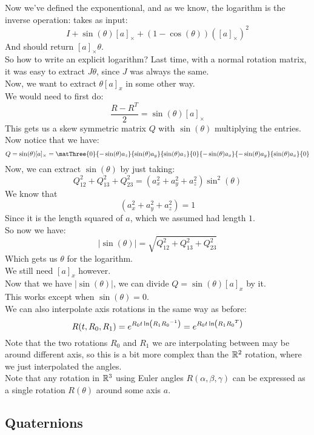\documentclass[12pt]{article}
\begin{document}
Now we've defined the exponentional,
and as we know, the logarithm is the inverse
operation: takes as input:
\[ I + \sin(\theta)[a]_\times 
+ (1-\cos(\theta))([a]_\times)^2 \]
And should return $[a]_\times\theta$. \\

So how to write an explicit logarithm?
Last time, with a normal rotation matrix,
it was easy to extract $J\theta$,
since $J$ was always the same. \\
Now, we want to extract $\theta[a]_x$
in some other way. \\

We would need to first do:
\[ \dfrac{R - R^T}{2} = \sin(\theta)[a]_\times \]
This gets us a skew symmetric matrix $Q$
with $\sin(\theta)$ multiplying the entries.
Now notice that we have:
\[ Q = \sin(\theta)[a]_\times
= \matThree{0}{-\sin(\theta)a_z}
{\sin(\theta)a_y}{\sin(\theta)a_z}{0}
{-\sin(\theta)a_x}{-\sin(\theta)a_y}
{\sin(\theta)a_x}{0}\]
Now, we can extract $\sin(\theta)$
by just taking:
\[ Q_{12}^2 + Q_{13}^2 + Q_{23}^2
= (a_x^2 + a_y^2 + a_z^2)\sin^2(\theta) \]
We know that
\[(a_x^2 + a_y^2 + a_z^2) = 1\]
Since it is the length squared of $a$,
which we assumed had length $1$. \\
So now we have:
\[ |\sin(\theta)| 
= \sqrt{Q_{12}^2 + Q_{13}^2 + Q_{23}^2} \]
Which gets us $\theta$ for the logarithm. \\

We still need $[a]_x$ however. \\
Now that we have $|\sin(\theta)|$,
we can divide $Q = \sin(\theta)[a]_x$
by it. \\
This works except when $\sin(\theta) = 0$. \\

We can also interpolate axis rotations
in the same way as before:
\[ R(t,R_0,R_1) = 
e^{{R_0t\ln\left( {R_1}{R_0}^{-1} \right)}}
= e^{{R_0t\ln\left( {R_1}{R_0}^T \right)}} \]
Note that the two rotations $R_0$
and $R_1$ we are
interpolating between may be around different
axis, so this is a bit more complex than the $\mathbb{R}^2$
rotation, where we just interpolated
the angles. \\

Note that any rotation in $\mathbb{R}^3$
using Euler angles
$R(\alpha, \beta, \gamma)$
can be expressed as a single rotation
$R(\theta)$ around some axis $a$. \\

\newpage

\subsection*{Quaternions}
\end{document}
